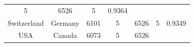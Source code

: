 \documentclass[10pt,]{article}
\begin{document}
\begin{longtable}[]{@{}ccccccc@{}}
\begin{minipage}[t]{0.09\columnwidth}
5\strut
\end{minipage} & \begin{minipage}[t]{0.14\columnwidth}\centering\strut
6526\strut
\end{minipage} & \begin{minipage}[t]{0.11\columnwidth}\centering\strut
5\strut
\end{minipage} & \begin{minipage}[t]{0.11\columnwidth}\centering\strut
0.9364\strut
\end{minipage}\tabularnewline
\begin{minipage}[t]{0.13\columnwidth}\centering\strut
Switzerland\strut
\end{minipage} & \begin{minipage}[t]{0.12\columnwidth}\centering\strut
Germany\strut
\end{minipage} & \begin{minipage}[t]{0.12\columnwidth}\centering\strut
6101\strut
\end{minipage} & \begin{minipage}[t]{0.09\columnwidth}\centering\strut
5\strut
\end{minipage} & \begin{minipage}[t]{0.14\columnwidth}\centering\strut
6526\strut
\end{minipage} & \begin{minipage}[t]{0.11\columnwidth}\centering\strut
5\strut
\end{minipage} & \begin{minipage}[t]{0.11\columnwidth}\centering\strut
0.9349\strut
\end{minipage}\tabularnewline
\begin{minipage}[t]{0.13\columnwidth}\centering\strut
USA\strut
\end{minipage} & \begin{minipage}[t]{0.12\columnwidth}\centering\strut
Canada\strut
\end{minipage} & \begin{minipage}[t]{0.12\columnwidth}\centering\strut
6073\strut
\end{minipage} & \begin{minipage}[t]{0.09\columnwidth}\centering\strut
5\strut
\end{minipage} & \begin{minipage}[t]{0.14\columnwidth}\centering\strut
6526\strut
\end{minipage} & \begin{minipage}[t]{0.11\columnwidth}\centering\strut

\end{minipage}
\end{longtable}
\end{document}
